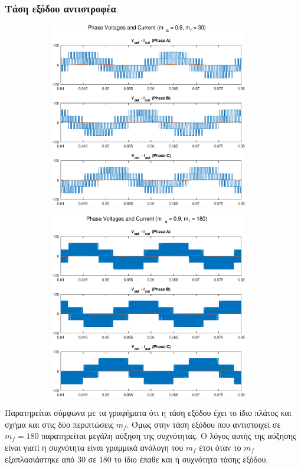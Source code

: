 \subsubsection*{Τάση εξόδου αντιστροφέα}
\begin{figure}[h!]
	\begin{subfigure}{0.49\textwidth}
		\centering
		\includegraphics[width=0.95\textwidth]{Images/4_Phase_V_I_30.eps}
	\end{subfigure}
	\begin{subfigure}{0.49\textwidth}
		\centering
		\includegraphics[width=0.95\textwidth]{Images/4_Phase_V_I_180.eps}
	\end{subfigure}
\end{figure}
\noindent
Παρατηρείται σύμφωνα με τα γραφήματα ότι η τάση εξόδου έχει το ίδιο πλάτος και σχήμα και στις δύο περιπτώσεις $m_f$. Όμως στην τάση εξόδου που αντιστοιχεί σε $m_f=180$ παρατηρείται μεγάλη αύξηση της συχνότητας. Ο λόγος αυτής της αύξησης είναι γιατί η συχνότητα είναι γραμμικά ανάλογη του $m_f$ έτσι όταν το $m_f$ εξαπλασιάστηκε από 30 σε 180 το ίδιο έπαθε και η συχνότητα τάσης εξόδου.

